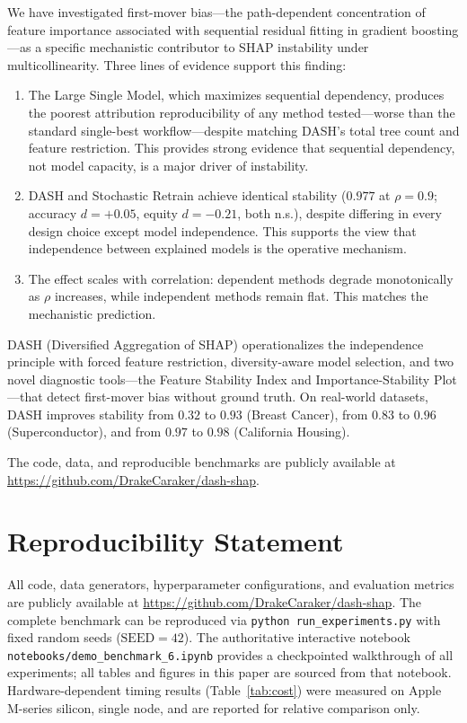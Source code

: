 \documentclass[11pt]{article}
\newcommand{\dash}{\textsc{DASH}}
\newcommand{\rhovar}{\rho}
\begin{document}
We have investigated first-mover bias---the path-dependent concentration of
feature importance associated with sequential residual fitting in gradient
boosting---as a specific mechanistic contributor to SHAP instability under
multicollinearity. Three lines of evidence support this finding:

\begin{enumerate}
  \item The Large Single Model, which maximizes sequential dependency,
    produces the poorest attribution reproducibility of any method tested---worse
    than the standard single-best workflow---despite matching \dash{}'s
    total tree count and feature restriction. This provides strong evidence that
    sequential dependency, not model capacity, is a major driver of instability.
  \item \dash{} and Stochastic Retrain achieve identical
    stability ($0.977$ at $\rhovar = 0.9$; accuracy $d = +0.05$,
    equity $d = -0.21$, both n.s.),
    despite differing in every design choice except model independence.
    This supports the view that independence between explained models is the
    operative mechanism.
  \item The effect scales with correlation: dependent methods degrade
    monotonically as $\rhovar$ increases, while independent methods
    remain flat. This matches the mechanistic prediction.
\end{enumerate}

\dash{} (Diversified Aggregation of SHAP) operationalizes the
independence principle with forced feature restriction, diversity-aware
model selection, and two novel diagnostic tools---the Feature Stability
Index and Importance-Stability Plot---that detect first-mover bias
without ground truth. On real-world datasets, \dash{} improves stability
from $0.32$ to $0.93$ (Breast Cancer), from $0.83$ to $0.96$
(Superconductor), and from $0.97$ to $0.98$ (California Housing).

The code, data, and reproducible benchmarks are publicly available at
\url{https://github.com/DrakeCaraker/dash-shap}.


\section*{Reproducibility Statement}

All code, data generators, hyperparameter configurations, and evaluation
metrics are publicly available at
\url{https://github.com/DrakeCaraker/dash-shap}. The complete benchmark
can be reproduced via \texttt{python run\_experiments.py} with fixed
random seeds ($\text{SEED} = 42$). The authoritative interactive
notebook \texttt{notebooks/demo\_benchmark\_6.ipynb} provides a
checkpointed walkthrough of all experiments; all tables and figures in
this paper are sourced from that notebook. Hardware-dependent timing
results (Table~\ref{tab:cost}) were measured on Apple M-series silicon,
single node, and are reported for relative comparison only.
\end{document}
